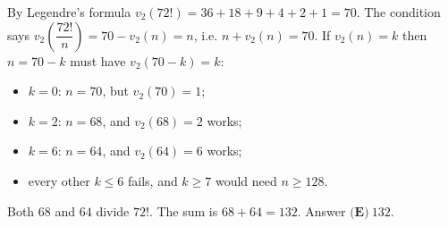 By Legendre's formula $v_2(72!)=36+18+9+4+2+1=70$. The condition says $v_2\!\left(\dfrac{72!}n\right)=70-v_2(n)=n$, i.e. $n+v_2(n)=70$. If $v_2(n)=k$ then $n=70-k$ must have $v_2(70-k)=k$:
\begin{itemize}
\item $k=0$: $n=70$, but $v_2(70)=1$;
\item $k=2$: $n=68$, and $v_2(68)=2$ works;
\item $k=6$: $n=64$, and $v_2(64)=6$ works;
\item every other $k\le6$ fails, and $k\ge7$ would need $n\ge128$.
\end{itemize}
Both $68$ and $64$ divide $72!$. The sum is $68+64=132$. Answer $\boxed{\textbf{(E)}\ 132}$.
